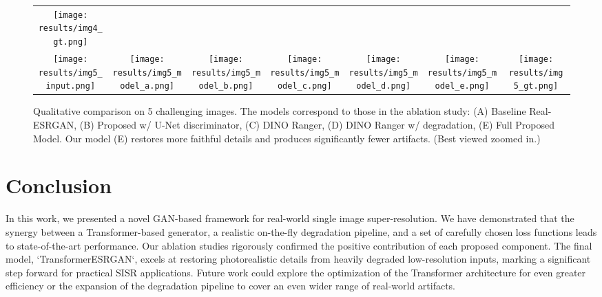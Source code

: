 \documentclass{article}
\begin{document}
\begin{figure*}[h!]
\begin{tabular}{@{}ccccccc@{}}
        \texttt{[image: results/img4\_gt.png]} \\
        \texttt{[image: results/img5\_input.png]} &
        \texttt{[image: results/img5\_model\_a.png]} &
        \texttt{[image: results/img5\_model\_b.png]} &
        \texttt{[image: results/img5\_model\_c.png]} &
        \texttt{[image: results/img5\_model\_d.png]} &
        \texttt{[image: results/img5\_model\_e.png]} &
        \texttt{[image: results/img5\_gt.png]} \\
    \end{tabular}
    \caption{Qualitative comparison on 5 challenging images. The models correspond to those in the ablation study: (A) Baseline Real-ESRGAN, (B) Proposed w/ U-Net discriminator, (C) DINO Ranger, (D) DINO Ranger w/ degradation, (E) Full Proposed Model. Our model (E) restores more faithful details and produces significantly fewer artifacts. (Best viewed zoomed in.)}
    \label{fig:qualitative_comparison}
\end{figure*}

\section{Conclusion}

In this work, we presented a novel GAN-based framework for real-world single image super-resolution. We have demonstrated that the synergy between a Transformer-based generator, a realistic on-the-fly degradation pipeline, and a set of carefully chosen loss functions leads to state-of-the-art performance. Our ablation studies rigorously confirmed the positive contribution of each proposed component. The final model, `TransformerESRGAN`, excels at restoring photorealistic details from heavily degraded low-resolution inputs, marking a significant step forward for practical SISR applications. Future work could explore the optimization of the Transformer architecture for even greater efficiency or the expansion of the degradation pipeline to cover an even wider range of real-world artifacts.
\end{document}
